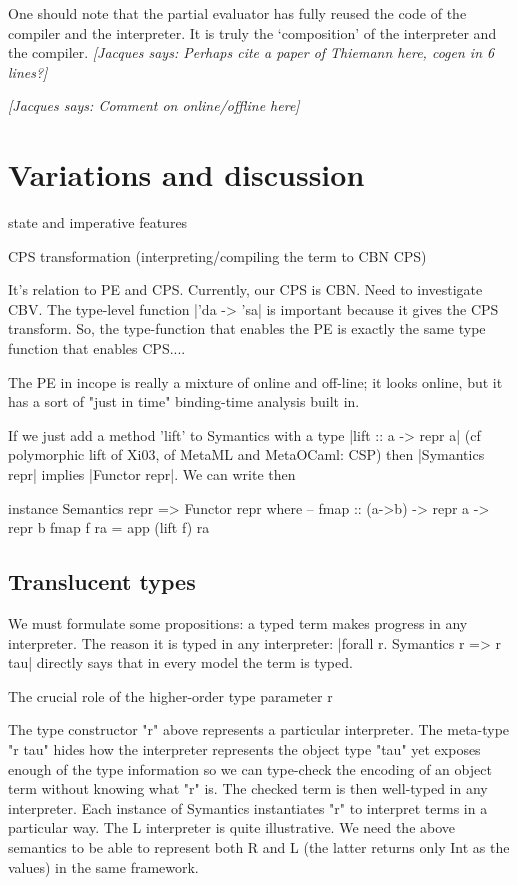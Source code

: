 \documentclass[preprint]{sigplanconf}
\newcommand{\jacques}[1]{{\it [Jacques says: #1]}}
\begin{document}
One should note that the partial evaluator has fully reused the code
of the compiler and the interpreter. It is truly the `composition' of the
interpreter and the compiler.  \jacques{Perhaps cite a paper of Thiemann
here, cogen in 6 lines?}

\jacques{Comment on online/offline here}


\section{Variations and discussion}\label{discussion}

state and imperative features

CPS transformation (interpreting/compiling the term to CBN CPS)

It's relation to PE and CPS. Currently, our CPS is CBN. Need to
investigate CBV.
The type-level function |'da -> 'sa| is important because it gives 
the CPS transform. So, the type-function
that enables the PE is exactly the same type function that enables
CPS....



The PE in incope is really a mixture of online and off-line; it looks 
online, but it has a sort of "just in time" binding-time analysis built in.

If we just add a method 'lift' to Symantics with a type
|lift :: a -> repr a| (cf polymorphic lift of Xi03, of MetaML and
MetaOCaml: CSP)
then |Symantics repr| implies |Functor repr|. We can write then
\begin{code}
  instance Semantics repr => Functor repr where
  -- fmap :: (a->b) -> repr a -> repr b
  fmap f ra = app (lift f) ra
\end{code}

\subsection{Translucent types}

We must formulate some propositions: a typed term makes progress in
any interpreter. The reason it is typed in any interpreter:
|forall r. Symantics r => r tau| directly says that in every model the
term is typed. 

The crucial role of the higher-order type parameter r

The type constructor "r" above represents a particular interpreter.  The
meta-type "r tau" hides how the interpreter represents the object type
"tau" yet exposes enough of the type information so we can type-check
the encoding of an object term without knowing what "r" is.  The checked
term is then well-typed in any interpreter.  Each instance of Symantics
instantiates "r" to interpret terms in a particular way. The L
interpreter is quite illustrative. We need the above semantics to be
able to represent both R and L (the latter returns only Int as the
values) in the same framework.
\end{document}
